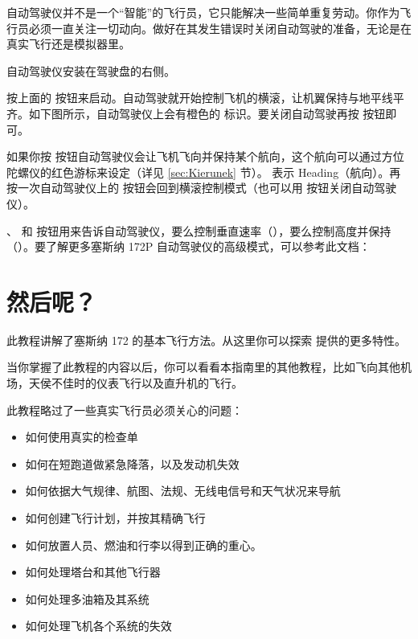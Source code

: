 \begin{itemize}
自动驾驶仪并不是一个“智能”的飞行员，它只能解决一些简单重复劳动。你作为飞行员必须一直关注一切动向。做好在其发生错误时关闭自动驾驶的准备，无论是在真实飞行还是模拟器里。

自动驾驶仪安装在驾驶盘的右侧。

按上面的  按钮来启动。自动驾驶就开始控制飞机的横滚，让机翼保持与地平线平齐。如下图所示，自动驾驶仪上会有橙色的 \textcolor{orange}{} 标识。要关闭自动驾驶再按  按钮即可。

如果你按  按钮自动驾驶仪会让飞机飞向并保持某个航向，这个航向可以通过方位陀螺仪的红色游标来设定（详见 \ref{sec:Kierunek} 节）。\textcolor{orange}{} 表示 Heading（航向）。再按一次自动驾驶仪上的  按钮会回到横滚控制模式（也可以用  按钮关闭自动驾驶仪）。

、 和  按钮用来告诉自动驾驶仪，要么控制垂直速率（\textcolor{orange}{}），要么控制高度并保持（\textcolor{orange}{}）。要了解更多塞斯纳 172P 自动驾驶仪的高级模式，可以参考此文档：

\section{然后呢？}
\label{sec:Poslowie}

此教程讲解了塞斯纳 172 的基本飞行方法。从这里你可以探索 \FlightGear{} 提供的更多特性。

当你掌握了此教程的内容以后，你可以看看本指南里的其他教程，比如飞向其他机场，天侯不佳时的仪表飞行以及直升机的飞行。

此教程略过了一些真实飞行员必须关心的问题：

\begin{itemize}
    \item 如何使用真实的检查单
    \item 如何在短跑道做紧急降落，以及发动机失效
    \item 如何依据大气规律、航图、法规、无线电信号和天气状况来导航
    \item 如何创建飞行计划，并按其精确飞行
    \item 如何放置人员、燃油和行李以得到正确的重心。
    \item 如何处理塔台和其他飞行器
    \item 如何处理多油箱及其系统
    \item 如何处理飞机各个系统的失效
\end{itemize}


\end{itemize}
